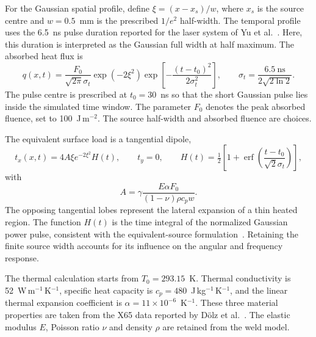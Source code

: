 For the Gaussian spatial profile, define $\xi=(x-x_s)/w$, where $x_s$ is the source centre and $w=0.5$~mm is the prescribed $1/e^2$ half-width. The temporal profile uses the 6.5~ns pulse duration reported for the laser system of Yu et al.~\cite{yu-2021}. Here, this duration is interpreted as the Gaussian full width at half maximum. The absorbed heat flux is
\begin{equation}
 q(x,t)=\frac{F_0}{\sqrt{2\pi}\sigma_t}
 \exp(-2\xi^2)
 \exp\!\left[-\frac{(t-t_0)^2}{2\sigma_t^2}\right],
 \qquad
 \sigma_t=\frac{6.5\ \mathrm{ns}}{2\sqrt{2\ln2}}.
\end{equation}
The pulse centre is prescribed at $t_0=30$~ns so that the short Gaussian pulse lies inside the simulated time window.  The parameter $F_0$ denotes the peak absorbed fluence, set to 100~J\,m$^{-2}$. The source half-width and absorbed fluence are choices.

The equivalent surface load is a tangential dipole,
\begin{equation}
 t_x(x,t)=4A\xi e^{-2\xi^2}H(t),\qquad t_y=0,
 \qquad
 H(t)=\tfrac12\left[
 1+\operatorname{erf}\!\left(
 \frac{t-t_0}{\sqrt2\sigma_t}
 \right)\right],
\end{equation}
with
\begin{equation}
 A=\gamma\frac{E\alpha F_0}{(1-\nu)\rho c_p w}.
\end{equation}
The opposing tangential lobes represent the lateral expansion of a thin heated region. The function $H(t)$ is the time integral of the normalized Gaussian power pulse, consistent with the equivalent-source formulation~\cite{tu}. Retaining the finite source width accounts for its influence on the angular and frequency response.

The thermal calculation starts from $T_0=293.15$~K. Thermal conductivity is 52~W\,m$^{-1}$\,K$^{-1}$, specific heat capacity is $c_p=480$~J\,kg$^{-1}$\,K$^{-1}$, and the linear thermal expansion coefficient is $\alpha=11\times10^{-6}$~K$^{-1}$. These three material properties are taken from the X65 data reported by Dölz et al.~\cite{dolz-2024}. The elastic modulus
$E$, Poisson ratio $\nu$ and density $\rho$ are retained from the weld model.

